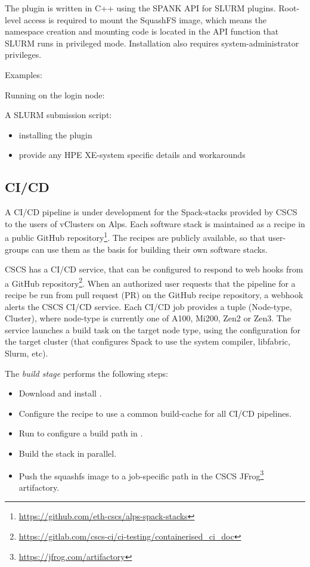 The plugin is written in C++ using the SPANK API for SLURM plugins.
Root-level access is required to mount the SquashFS image, which means the namespace creation and mounting code is located in the API function that SLURM runs in privileged mode.
Installation also requires system-administrator privileges.

Examples:

Running on the login node:


A SLURM submission script:


\begin{itemize}
    \item installing the plugin
    \item provide any HPE XE-system specific details and workarounds
\end{itemize}

\subsection{CI/CD}

A CI/CD pipeline is under development for the Spack-stacks provided by CSCS to the users of vClusters on Alps.
Each software stack is maintained as a \stackinator recipe in a public GitHub repository\footnote{\url{https://github.com/eth-cscs/alps-spack-stacks}}.
The recipes are publicly available, so that user-groups can use them as the basis for building their own software stacks.

CSCS has a CI/CD service, that can be configured to respond to web hooks from a GitHub repository\footnote{\url{https://gitlab.com/cscs-ci/ci-testing/containerised_ci_doc}}.
When an authorized user requests that the pipeline for a recipe be run from pull request (PR) on the GitHub recipe repository, a webhook alerts the CSCS CI/CD service.
Each CI/CD job provides a tuple {\sf (Node-type, Cluster)}, where node-type is currently one of A100, Mi200, Zen2 or Zen3.
The service launches a build task on the target node type, using the configuration for the target cluster (that configures Spack to use the system compiler, libfabric, Slurm, etc).

The \emph{build stage} performs the following steps:
\begin{itemize}
    \item Download and install \stackinator.
    \item Configure the recipe to use a common build-cache for all CI/CD pipelines.
    \item Run \stackinator {} to configure a build path in .
    \item Build the stack in parallel.
    \item Push the squashfs image to a job-specific path in the CSCS JFrog\footnote{\url{https://jfrog.com/artifactory}} artifactory.
\end{itemize}

